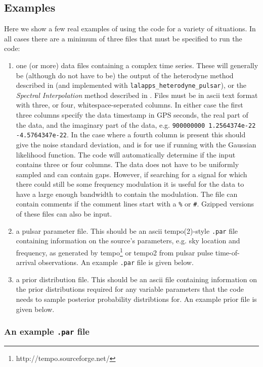 \subsection{Examples}\label{app:examples}

Here we show a few real examples of using the code for a variety of situations. In all cases there are a minimum of
three files that must be specified to run the code:
\begin{enumerate}
 \item one (or more) data files containing a complex time series. These will generally be (although do not have to be) the output
 of the heterodyne method described in \citep{2005PhRvD..72j2002D} (and implemented with {\tt lalapps\_heterodyne\_pulsar}), or
 the {\it Spectral Interpolation} method described in \citep{2017CQGra..34a5010D}. Files must be in ascii text format with three, or
 four, whitespace-seperated columns. In either case the first three columns
 specify the data timestamp in GPS seconds, the real part of the data, and the imaginary part of the data, e.g.
 \verb|900000000 1.2564374e-22 -4.5764347e-22|. In the case where a fourth column is present this should give the noise standard
 deviation, and is for use if running with the Gaussian likelihood function. The code will automatically determine if the input
 contains three or four columns. The data does not have to be uniformly sampled and can 
contain gaps. However,
 if searching for a signal for which there could still be some frequency modulation it is useful for the data to have a large
 enough bandwidth to contain the modulation.
 The file can contain comments if the comment lines start with
 a \verb|%| or \verb|#|. Gzipped versions of these files can also be input.
 \item a pulsar parameter file. This should be an ascii {\sc tempo(2)}-style \verb|.par| file containing information on the
 source's parameters, e.g. sky location and frequency, as generated by {\sc tempo}\footnote{http://tempo.sourceforge.net/} or
 {\sc tempo2} \citep{2006MNRAS.369..655H}  from pulsar pulse time-of-arrival observations. An example \verb|.par| file is given below.
 \item a prior distribution file. This should be an ascii file containing information on the prior distributions
 required for any variable parameters that the code needs to sample posterior probability distribtions for. An example
 prior file is given below.
\end{enumerate}

\subsubsection{An example {\tt .par} file}

